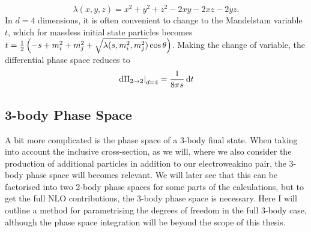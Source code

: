 \documentclass[../main.tex]{subfiles}
\begin{document}
\begin{equation}
  \label{pc:eq:kallen}
  \lambda(x, y, z) = x^2 + y^2 + z^2  - 2xy - 2xz - 2yz.
\end{equation}
In \(d=4\) dimensions, it is often convenient to change to the Mandelstam
variable \(t\), which for massless initial state particles becomes
\(t=\frac{1}{2}\left(-s+m_i^2+m_j^2+\sqrt{\lambda(s,m_i^2,m_j^2)}\cos\theta\right)\).
Making the change of variable, the differential phase space reduces to
\begin{equation}
  \label{pc:eq:dPi_dt}
  \left.\mathrm{d}\Pi_{2\to 2}\right|_{d=4} = \frac{1}{8\pi s} \,\mathrm{d}t
\end{equation}


\subsection{3-body Phase Space}
A bit more complicated is the phase space of a 3-body final state.
When taking into account the inclusive cross-section, as we will, where we also consider the production of additional particles in addition to our electroweakino pair, the 3-body phase space will becomes relevant.
We will later see that this can be factorised into two 2-body phase spaces for some parts of the calculations, but to get the full NLO contributions, the 3-body phase space is necessary.
Here I will outline a method for parametrising the degrees of freedom in the full 3-body case, although the phase space integration will be beyond the scope of this thesis.
\medskip
\end{document}
